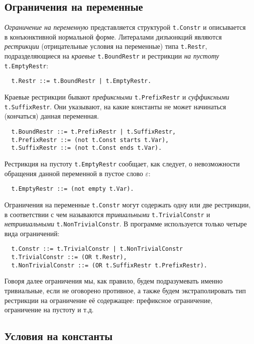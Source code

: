 \documentclass[12pt]{article}
\begin{document}
\subsection{Ограничения на переменные}

\textit{Ограничение на переменную} представляется структурой \texttt{t.Constr}
и описывается в конъюнктивной нормальной форме. Литералами дизъюнкций являются
\textit{рестрикции} (отрицательные условия на переменные) типа \texttt{t.Restr},
подразделяющиеся на \textit{краевые} \texttt{t.BoundRestr} и рестрикции
\textit{на пустоту} \texttt{t.EmptyRestr}:
\begin{Verbatim}
  t.Restr ::= t.BoundRestr | t.EmptyRestr.
\end{Verbatim}

Краевые рестрикции бывают \textit{префиксными} \texttt{t.PrefixRestr} и
\textit{суффиксными} \texttt{t.SuffixRestr}. Они указывают, на какие константы
не может начинаться (кончаться) данная переменная.
\begin{Verbatim}
  t.BoundRestr ::= t.PrefixRestr | t.SuffixRestr,
  t.PrefixRestr ::= (not t.Const starts t.Var),
  t.SuffixRestr ::= (not t.Const ends t.Var).
\end{Verbatim}

Рестрикция на пустоту \texttt{t.EmptyRestr} сообщает, как следует, о
невозможности обращения данной переменной в пустое слово $\varepsilon$:
\begin{Verbatim}
  t.EmptyRestr ::= (not empty t.Var).
\end{Verbatim}

Ограничения на переменные \texttt{t.Constr} могут содержать одну или две
рестрикции, в соответствии с чем называются \textit{тривиальными}
\texttt{t.TrivialConstr} и \textit{нетривиальными} \texttt{t.NonTrivialConstr}.
В программе используется только четыре вида ограничений:
\begin{Verbatim}
  t.Constr ::= t.TrivialConstr | t.NonTrivialConstr
  t.TrivialConstr ::= (OR t.Restr),
  t.NonTrivialConstr ::= (OR t.SuffixRestr t.PrefixRestr).
\end{Verbatim}

Говоря далее ограничения мы, как правило, будем подразумевать именно
тривиальные, если не оговорено противное, а также будем экстраполировать
тип рестрикции на ограничение её содержащее: префиксное ограничение,
ограничение на пустоту и т.д.

\subsection{Условия на константы}
\end{document}

